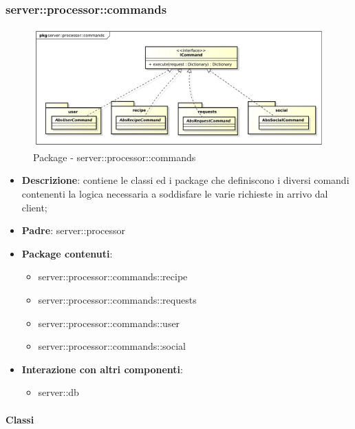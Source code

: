     \subsubsection{server::processor::commands} %
    \label{ssub:bdsm_app_server_processor_commands}
    \begin{figure}[!htbp]
      \centering
      \centerline{\includegraphics[scale=0.4]{./images/server/commands.pdf}}
      \caption{Package - server::processor::commands}
    \end{figure}

    \begin{itemize}
      \item \textbf{Descrizione}: contiene le classi ed i package che definiscono i diversi comandi contenenti la logica necessaria a soddisfare le varie richieste in arrivo dal client;
      \item \textbf{Padre}: server::processor
      \item \textbf{Package contenuti}:
        \begin{itemize}
          \item server::processor::commands::recipe
          \item server::processor::commands::requests
          \item server::processor::commands::user
          \item server::processor::commands::social
        \end{itemize}
      \item \textbf{Interazione con altri componenti}:
        \begin{itemize}
          \item server::db
        \end{itemize}
    \end{itemize}

      \paragraph{Classi} %

